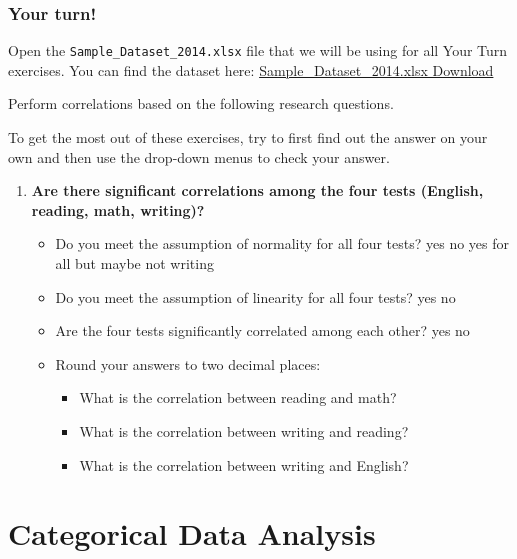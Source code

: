 \documentclass[
]{book}
\begin{document}
\hypertarget{your-turn-4}{%
\section{Your turn!}\label{your-turn-4}}

Open the \texttt{Sample\_Dataset\_2014.xlsx} file that we will be using for all Your Turn exercises. You can find the dataset here: \href{https://github.com/danawanzer/stats-with-jamovi/blob/master/data/Sample_Dataset_2014.xlsx}{Sample\_Dataset\_2014.xlsx Download}

Perform correlations based on the following research questions.

To get the most out of these exercises, try to first find out the answer on your own and then use the drop-down menus to check your answer.

\begin{enumerate}
\def\labelenumi{\arabic{enumi}.}
\item
  \textbf{Are there significant correlations among the four tests (English, reading, math, writing)?}

  \begin{itemize}
  \item
    Do you meet the assumption of normality for all four tests? yes no yes for all but maybe not writing
  \item
    Do you meet the assumption of linearity for all four tests? yes no
  \item
    Are the four tests significantly correlated among each other? yes no
  \item
    Round your answers to two decimal places:

    \begin{itemize}
    \item
      What is the correlation between reading and math?
    \item
      What is the correlation between writing and reading?
    \item
      What is the correlation between writing and English?
    \end{itemize}
  \end{itemize}
\end{enumerate}

\hypertarget{part-categorical-data-analysis}{%
\part{Categorical Data Analysis}\label{part-categorical-data-analysis}}
\end{document}
